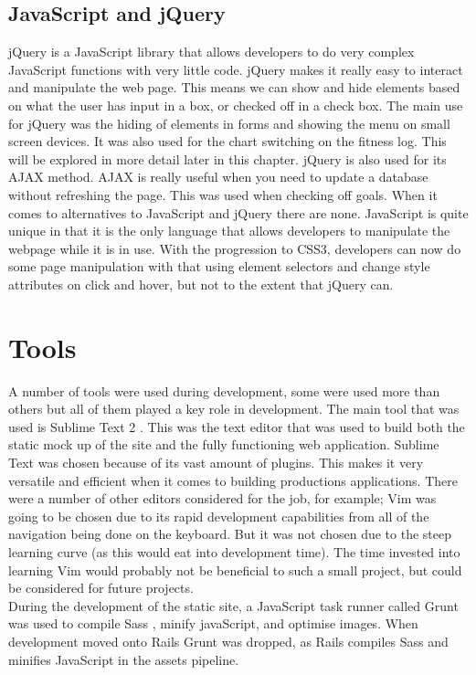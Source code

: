 \subsection{JavaScript and jQuery}
jQuery is a JavaScript library that allows developers to do very complex JavaScript functions with very little code. jQuery makes it really easy to interact and manipulate the web page. This means we can show and hide elements based on what the user has input in a box, or checked off in a check box. The main use for jQuery was the hiding of elements in forms and showing the menu on small screen devices. It was also used for the chart switching on the fitness log. This will be explored in more detail later in this chapter. jQuery is also used for its AJAX method. AJAX is really useful when you need to update a database without refreshing the page. This was used when checking off goals. When it comes to alternatives to JavaScript and jQuery there are none. JavaScript is quite unique in that it is the only language that allows developers to manipulate the webpage while it is in use. With the progression to CSS3, developers can now do some page manipulation with that using element selectors and change style attributes on click and hover, but not to the extent that jQuery can.\\

\section{Tools}
A number of tools were used during development, some were used more than others but all of them played a key role in development. The main tool that was used is Sublime Text 2 \citep{sublimetext:2011}. This was the text editor that was used to build both the static mock up of the site and the fully functioning web application. Sublime Text was chosen because of its vast amount of plugins. This makes it very versatile and efficient when it comes to building productions applications. There were a number of other editors considered for the job, for example; Vim \citep{vim:2013} was going to be chosen due to its rapid development capabilities from all of the navigation being done on the keyboard. But it was not chosen due to the steep learning curve (as this would eat into development time). The time invested into learning Vim would probably not be beneficial to such a small project, but could be considered for future projects.\\

During the development of the static site, a JavaScript task runner called Grunt was used to compile Sass \citep{sass:2006}, minify javaScript, and optimise images. When development moved onto Rails Grunt was dropped, as Rails compiles Sass and minifies JavaScript in the assets pipeline.\\

